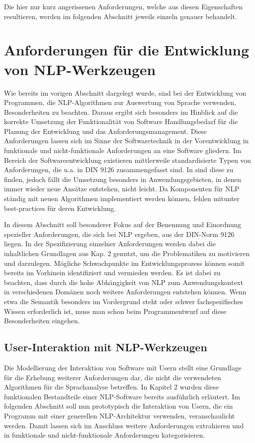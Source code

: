 \documentclass[12pt]{report}
\begin{document}
Die hier nur kurz angerissenen Anforderungen, welche aus diesen Eigenschaften resultieren, werden im folgenden Abschnitt jeweils einzeln genauer behandelt.

\section[Anforderungen an NLP-Werkzeuge]{Anforderungen für die Entwicklung von NLP-Werkzeugen}
Wie bereits im vorigen Abschnitt dargelegt wurde, sind bei der Entwicklung von Programmen, die NLP-Algorithmen zur Auswertung von Sprache verwenden, Besonderheiten zu beachten. Daraus ergibt sich besonders im Hinblick auf die korrekte Umsetzung der Funktionalität von Software Handlungsbedarf für die Planung der Entwicklung und das Anforderungsmanagement. Diese Anforderungen lassen sich im Sinne der Softwaretechnik in der Vorentwicklung in funktionale und nicht-funktionale Anforderungen an eine Software gliedern. Im Bereich der Softwareentwicklung existieren mittlerweile standardisierte Typen von Anforderungen, die u.a. in DIN 9126 zusammengefasst sind. In \cite{bal98} sind diese zu finden, jedoch fällt die Umsetzung besonders in Anwendungsgebieten, in denen immer wieder neue Ansätze entstehen, nicht leicht. Da Komponenten für NLP ständig mit neuen Algorithmen implementiert werden können, fehlen mitunter best-practices für deren Entwicklung.

In diesem Abschnitt soll besonderer Fokus auf der Benennung und Einordnung spezieller Anforderungen, die sich bei NLP ergeben, aus der DIN-Norm 9126 liegen. In der Spezifizierung einzelner Anforderungen werden dabei die inhaltlichen Grundlagen aus Kap. 2 genutzt, um die Problematiken zu motivieren und darzulegen. Mögliche Schwachpunkte im Entwicklungsprozess können somit bereits im Vorhinein identifiziert und vermieden werden. Es ist dabei zu beachten, dass durch die hohe Abhängigkeit von NLP zum Anwendungskontext in verschiedenen Domänen noch weitere Anforderungen entstehen können. Wenn etwa die Semantik besonders im Vordergrund steht oder schwer fachspezifisches Wissen erforderlich ist, muss man schon beim Programmentwurf auf diese Besonderheiten eingehen.

\subsection{User-Interaktion mit NLP-Werkzeugen}
Die Modellierung der Interaktion von Software mit Usern stellt eine Grundlage für die Erhebung weiterer Anforderungen dar, die nicht die verwendeten Algorithmen für die Sprachanalyse betreffen. In Kapitel 2 wurden diese funktionalen Bestandteile einer NLP-Software bereits ausführlich erläutert.
Im folgenden Abschnitt soll nun prototypisch die Interaktion von Usern, die ein Programm mit einer generellen NLP-Architektur verwenden, veranschaulicht werden. Damit lassen sich im Anschluss weitere Anforderungen extrahieren und in funktionale und nicht-funktionale Anforderungen kategorisieren.
\end{document}
